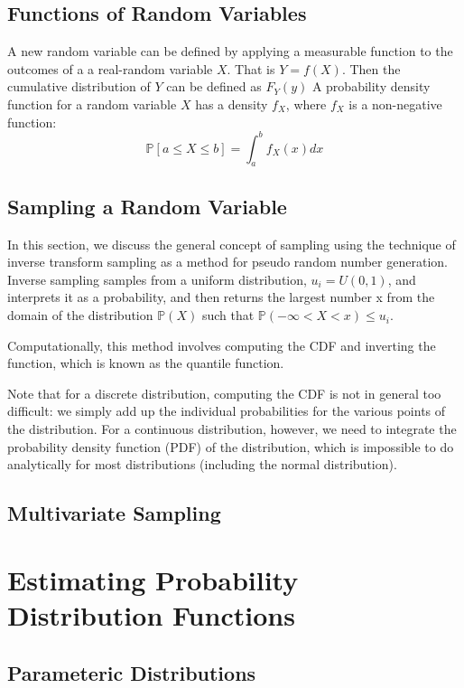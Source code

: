\subsection{Functions of Random Variables}
A new random variable can be defined by applying a measurable function to the outcomes of a a real-random variable $X$.  That is $Y=f(X)$.  Then the cumulative distribution of $Y$ can be defined as $F_Y(y)$
A probability density function for a random variable $X$ has a density $f_X$, where $f_X$ is a non-negative function:
\begin{equation}
  \mathbb{P}[a \leq X \leq b]=\int_{a}^{b}f_{X}(x)dx
\end{equation}

\subsection{Sampling a Random Variable}

In this section, we discuss the general concept of sampling using the technique of inverse transform sampling as a method for pseudo random number generation.  Inverse sampling samples from a uniform distribution, $u_i=U(0,1)$, and interprets it as a probability, and then returns the largest number x from the domain of the distribution $\mathbb{P}(X)$ such that $\mathbb{P}(-\infty<X<x) \leq u_i$.

Computationally, this method involves computing the CDF and inverting the function, which is known as the quantile function.

Note that for a discrete distribution, computing the CDF is not in general too difficult: we simply add up the individual probabilities for the various points of the distribution.  For a continuous distribution, however, we need to integrate the probability density function (PDF) of the distribution, which is impossible to do analytically for most distributions (including the normal distribution).

\subsection{Multivariate Sampling}
\label{section:multivariate_sampling}

\section{Estimating Probability Distribution Functions}

\subsection{Parameteric Distributions}

